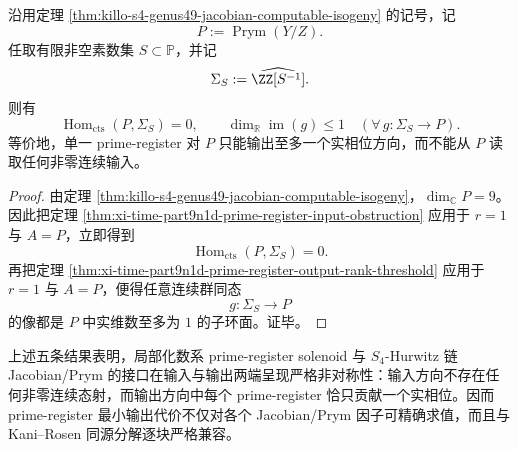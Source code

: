 \begin{proposition}\label{prop:xi-time-part9n1d-prym-single-register-asymmetry}
沿用定理 \ref{thm:killo-s4-genus49-jacobian-computable-isogeny} 的记号，记
\[
P:=\operatorname{Prym}(Y/Z).
\]
任取有限非空素数集 \(S\subset \mathbb P\)，并记
\[
\Sigma_S:=\widehat{\ZZ[S^{-1}]}.
\]
则有
\[
\boxed{\;
\operatorname{Hom}_{\mathrm{cts}}(P,\Sigma_S)=0,
\qquad
\dim_{\mathbb R}\operatorname{im}(g)\le 1
\quad
(\forall\, g:\Sigma_S\to P).\;}
\]
等价地，单一 prime-register 对 \(P\) 只能输出至多一个实相位方向，而不能从 \(P\) 读取任何非零连续输入。
\end{proposition}
\begin{proof}
由定理 \ref{thm:killo-s4-genus49-jacobian-computable-isogeny}，\(\dim_{\mathbb C}P=9\)。因此把定理 \ref{thm:xi-time-part9n1d-prime-register-input-obstruction} 应用于 \(r=1\) 与 \(A=P\)，立即得到
\[
\operatorname{Hom}_{\mathrm{cts}}(P,\Sigma_S)=0.
\]
再把定理 \ref{thm:xi-time-part9n1d-prime-register-output-rank-threshold} 应用于 \(r=1\) 与 \(A=P\)，便得任意连续群同态
\[
g:\Sigma_S\to P
\]
的像都是 \(P\) 中实维数至多为 \(1\) 的子环面。证毕。
\end{proof}

\noindent
上述五条结果表明，局部化数系 prime-register solenoid 与 \(S_4\)-Hurwitz 链 Jacobian/Prym 的接口在输入与输出两端呈现严格非对称性：输入方向不存在任何非零连续态射，而输出方向中每个 prime-register 恰只贡献一个实相位。因而 prime-register 最小输出代价不仅对各个 Jacobian/Prym 因子可精确求值，而且与 Kani--Rosen 同源分解逐块严格兼容。

\endinput
